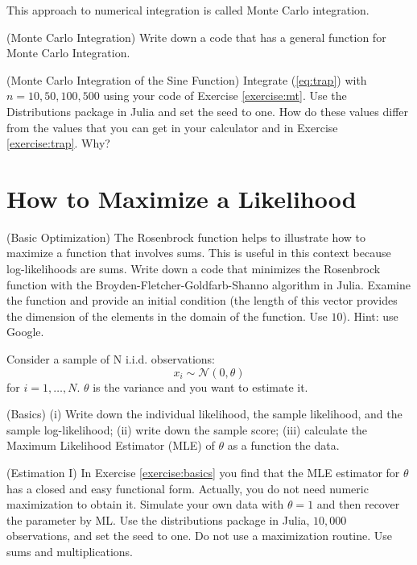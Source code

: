 \noindent This approach to numerical integration is called Monte Carlo integration.

\begin{exercise} (Monte Carlo Integration) \label{exercise:mt}
Write down a code that has a general function for Monte Carlo Integration.
\end{exercise}

\begin{exercise} (Monte Carlo Integration of the Sine Function)
Integrate (\ref{eq:trap}) with $n=10,50,100,500$ using your code of Exercise \ref{exercise:mt}. Use the Distributions package in Julia and set the seed to one. How do these values differ from the values that you can get in your calculator and in Exercise \ref{exercise:trap}. Why?
\end{exercise}

\section{How to Maximize a Likelihood}

\begin{exercise} (Basic Optimization)
\noindent The Rosenbrock function helps to illustrate how to maximize a function that involves sums. This is useful in this context because log-likelihoods are sums. Write down a code that minimizes the  Rosenbrock function with the Broyden-Fletcher-Goldfarb-Shanno algorithm in Julia. Examine the function and provide an initial condition (the length of this vector provides the dimension of the elements in the domain of the function. Use $10$). Hint: use Google.
\end{exercise}

Consider a sample of N i.i.d. observations:
\begin{equation}
x_{i} \sim \mathcal{N}(0,\theta)
\end{equation}
\noindent for $i = 1, \ldots, N$. $\theta$ is the variance and you want to estimate it. 

\begin{exercise} (Basics) \label{exercise:basics}
(i) Write down the individual likelihood, the sample likelihood, and the sample log-likelihood; (ii) write down the sample score; (iii) calculate the Maximum Likelihood Estimator (MLE) of $\theta$ as a function the data.
\end{exercise}

\begin{exercise} (Estimation I) \label{exercise:manual}
In Exercise \ref{exercise:basics} you find that the MLE estimator for $\theta$ has a closed and easy functional form. Actually, you do not need numeric maximization to obtain it. Simulate your own data with $\theta = 1$ and then recover the parameter by ML. Use the distributions package in Julia, $10,000$ observations, and set the seed to one. Do not use a maximization routine. Use sums and multiplications. 
\end{exercise}

